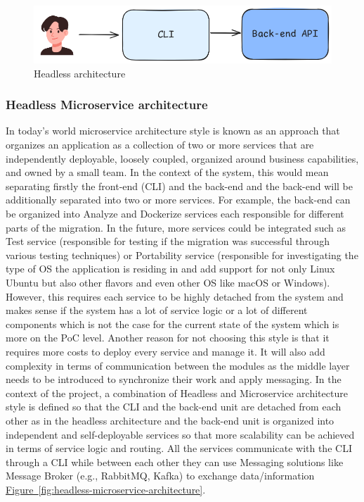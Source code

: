 \documentclass{article}
\newcommand{\FigRef}[1]{\hyperref[#1]{Figure~\ref{#1}}}
\begin{document}
\begin{multicols}{2}
\begin{figure}[H]
    \centering
    \includegraphics[width=\linewidth]{images/headless-architecture.png}
    \caption{Headless architecture}
    \label{fig:headless-architecture}
\end{figure}

\subsubsection{Headless Microservice architecture}
In today's world microservice architecture style is known as an approach that organizes an application as a collection of two or more services that are independently deployable, loosely coupled, organized around business capabilities, and owned by a small team. In the context of the system, this would mean separating firstly the front-end (CLI) and the back-end and the back-end will be additionally separated into two or more services. For example, the back-end can be organized into Analyze and Dockerize services each responsible for different parts of the migration. In the future, more services could be integrated such as Test service (responsible for testing if the migration was successful through various testing techniques) or Portability service (responsible for investigating the type of OS the application is residing in and add support for not only Linux Ubuntu but also other flavors and even other OS like macOS or Windows). However, this requires each service to be highly detached from the system and makes sense if the system has a lot of service logic or a lot of different components which is not the case for the current state of the system which is more on the PoC level. Another reason for not choosing this style is that it requires more costs to deploy every service and manage it. It will also add complexity in terms of communication between the modules as the middle layer needs to be introduced to synchronize their work and apply messaging. In the context of the project, a combination of Headless and Microservice architecture style is defined so that the CLI and the back-end unit are detached from each other as in the headless architecture and the back-end unit is organized into independent and self-deployable services so that more scalability can be achieved in terms of service logic and routing. All the services communicate with the CLI through a CLI while between each other they can use Messaging solutions like Message Broker (e.g., RabbitMQ, Kafka) to exchange data/information \FigRef{fig:headless-microservice-architecture}.


\end{multicols}
\end{document}
